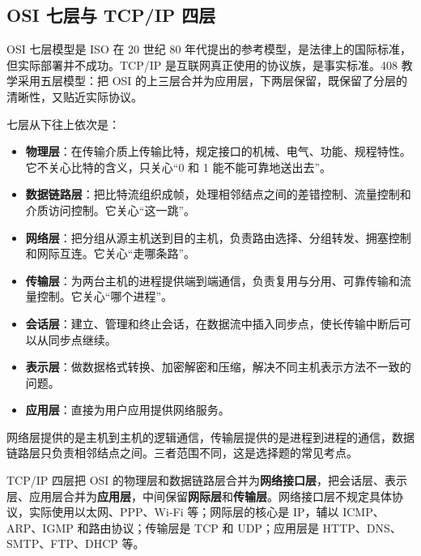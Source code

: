 \subsection{OSI 七层与 TCP/IP 四层}

OSI 七层模型是 ISO 在 20 世纪 80 年代提出的参考模型，是法律上的国际标准，但实际部署并不成功。TCP/IP 是互联网真正使用的协议族，是事实标准。408 教学采用五层模型：把 OSI 的上三层合并为应用层，下两层保留，既保留了分层的清晰性，又贴近实际协议。

七层从下往上依次是：
\begin{itemize}
  \item \textbf{物理层}：在传输介质上传输比特，规定接口的机械、电气、功能、规程特性。它不关心比特的含义，只关心“0 和 1 能不能可靠地送出去”。
  \item \textbf{数据链路层}：把比特流组织成帧，处理相邻结点之间的差错控制、流量控制和介质访问控制。它关心“这一跳”。
  \item \textbf{网络层}：把分组从源主机送到目的主机，负责路由选择、分组转发、拥塞控制和网际互连。它关心“走哪条路”。
  \item \textbf{传输层}：为两台主机的进程提供端到端通信，负责复用与分用、可靠传输和流量控制。它关心“哪个进程”。
  \item \textbf{会话层}：建立、管理和终止会话，在数据流中插入同步点，使长传输中断后可以从同步点继续。
  \item \textbf{表示层}：做数据格式转换、加密解密和压缩，解决不同主机表示方法不一致的问题。
  \item \textbf{应用层}：直接为用户应用提供网络服务。
\end{itemize}

网络层提供的是主机到主机的逻辑通信，传输层提供的是进程到进程的通信，数据链路层只负责相邻结点之间。三者范围不同，这是选择题的常见考点。

TCP/IP 四层把 OSI 的物理层和数据链路层合并为\textbf{网络接口层}，把会话层、表示层、应用层合并为\textbf{应用层}，中间保留\textbf{网际层}和\textbf{传输层}。网络接口层不规定具体协议，实际使用以太网、PPP、Wi-Fi 等；网际层的核心是 IP，辅以 ICMP、ARP、IGMP 和路由协议；传输层是 TCP 和 UDP；应用层是 HTTP、DNS、SMTP、FTP、DHCP 等。

